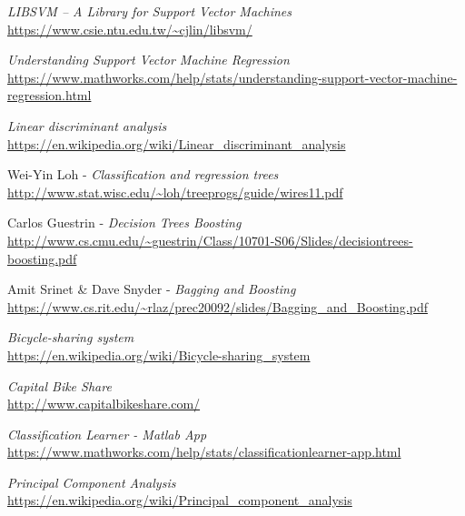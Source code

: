 \documentclass[journal, a4paper]{IEEEtran}
\begin{document}
\begin{thebibliography}{5}
    \textit{LIBSVM -- A Library for Support Vector Machines} \\
    \url{https://www.csie.ntu.edu.tw/~cjlin/libsvm/}
    
    \textit{Understanding Support Vector Machine Regression}\\
    \url{https://www.mathworks.com/help/stats/understanding-support-vector-machine-regression.html}
    
    \textit{Linear discriminant analysis}\\
    \url{https://en.wikipedia.org/wiki/Linear_discriminant_analysis}
    
    Wei-Yin Loh - \textit{Classification and regression trees}\\
    \url{http://www.stat.wisc.edu/~loh/treeprogs/guide/wires11.pdf}
    
    Carlos Guestrin - \textit{Decision Trees Boosting}\\
    \url{http://www.cs.cmu.edu/~guestrin/Class/10701-S06/Slides/decisiontrees-boosting.pdf}
    
    Amit Srinet \& Dave Snyder - \textit{Bagging and Boosting}\\
    \url{https://www.cs.rit.edu/~rlaz/prec20092/slides/Bagging_and_Boosting.pdf}
    
    \textit{Bicycle-sharing system}\\
    \url{https://en.wikipedia.org/wiki/Bicycle-sharing_system}
    
    \textit{Capital Bike Share}\\
    \url{http://www.capitalbikeshare.com/}
    
    \textit{Classification Learner - Matlab App}\\
    \url{https://www.mathworks.com/help/stats/classificationlearner-app.html}
    
    \textit{Principal Component Analysis}\\
    \url{https://en.wikipedia.org/wiki/Principal_component_analysis}
    
    \bibitem{}
    \textit{}\\
    \url{}
    
    \bibitem{}
    \textit{}\\
    \url{}
    
    \bibitem{}
    \textit{}\\
    \url{}
    
    \bibitem{}
    \textit{}\\
    \url{}
    
    \bibitem{}
    \textit{}\\
    \url{}
    
    
    
    
    
    
\end{thebibliography}
\end{document}
